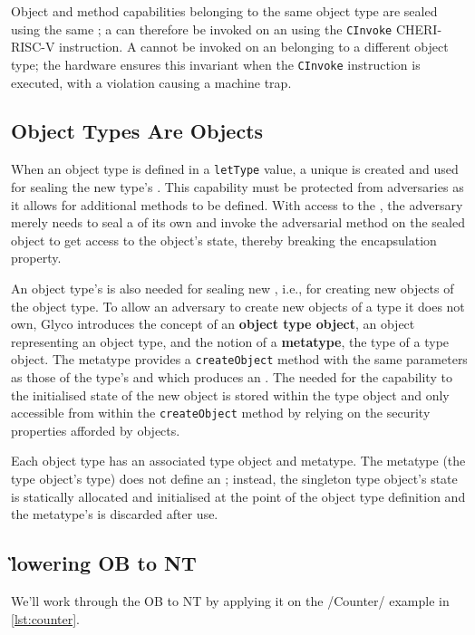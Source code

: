\documentclass[main.tex]{subfiles}
\begin{document}
Object and method capabilities belonging to the same object type are sealed using the same ; a  can therefore be invoked on an  using the \texttt{CInvoke} CHERI-RISC-V instruction. A  cannot be invoked on an  belonging to a different object type; the hardware ensures this invariant when the \texttt{CInvoke} instruction is executed, with a violation causing a machine trap.

\subsection{Object Types Are Objects}
When an object type is defined in a \texttt{letType} value, a unique  is created and used for sealing the new type's . This capability must be protected from adversaries as it allows for additional methods to be defined. With access to the , the adversary merely needs to seal a  of its own and invoke the adversarial method on the sealed object to get access to the object's state, thereby breaking the encapsulation property.

An object type's  is also needed for sealing new , i.e., for creating new objects of the object type. To allow an adversary to create new objects of a type it does not own, Glyco introduces the concept of an \textbf{object type object}, an object representing an object type, and the notion of a \textbf{metatype}, the type of a type object. The metatype provides a \texttt{createObject} method with the same parameters as those of the type's  and which produces an . The  needed for  the capability to the initialised state of the new object is stored within the type object and only accessible from within the \texttt{createObject} method by relying on the security properties afforded by objects.

Each object type has an associated type object and metatype. The metatype (the type object's type) does not define an ; instead, the singleton type object's state is statically allocated and initialised at the point of the object type definition and the metatype's  is discarded after use.

\subsection{\G{lowering} OB to NT}
We'll work through the OB to NT  by applying it on the \iil/Counter/ example in \cref{lst:counter}.
\end{document}
